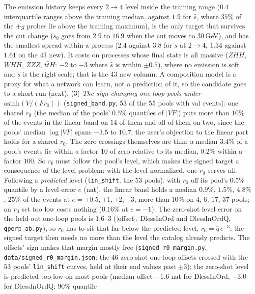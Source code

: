 \documentclass[11pt]{article}
\newcommand{\code}[1]{\texttt{#1}}
\begin{document}
The emission history keeps every $2\to4$ level inside the training range ($0.4$ interquartile ranges above the training
median, against $1.9$ for $\hat s$, where $35\%$ of the $+g$ probes lie above the training maximum), is the only target
that survives the cut change ($s_0$ goes from $2.9$ to $16.9$ when the cut moves to $30$\,GeV), and has the smallest
spread within a process ($2.4$ against $3.8$ for $\hat s$ at $2\to4$, $1.34$ against $1.61$ on the $43$ new). It costs on
processes whose final state is all massive ($Z HH$, $W HH$, $ZZZ$, $t\bar tH$: $-2$ to $-3$ where $\hat s$ is within
$\pm0.5$), where no emission is soft and $\hat s$ is the right scale; that is the $43$ new column. A composition model is a
proxy for what a network can learn, not a prediction of it, so the candidate goes to a short run (next). (3) \emph{The
sign-changing one-loop pools under $\mathrm{asinh}(V/(F r_0))$} (\code{signed\_band.py}, $53$ of the $55$ pools with val
events): one shared $r_0$ (the median of the pools' $0.5\%$ quantiles of $|VF|$) puts more than $10\%$ of the events in the
linear band on $14$ of them and all of them on two, since the pools' median $\log|VF|$ spans $-3.5$ to $10.7$; the user's
objection to the linear part holds for a shared $r_0$. The zero crossings themselves are thin: a median $3.4\%$ of a pool's
events lie within a factor $10$ of zero relative to its median, $0.2\%$ within a factor $100$. So $r_0$ must follow the
pool's level, which makes the signed target a consequence of the level problem: with the level normalized, one $r_0$
serves all. Following a \emph{predicted} level (\code{lin\_shift}, the $53$ pools): with $r_0$ off its pool's $0.5\%$
quantile by a level error $e$ (nat), the linear band holds a median $0.9\%$, $1.5\%$, $4.8\%$, $25\%$ of the events at
$e=+0.5,+1,+2,+3$, more than $10\%$ on $4$, $6$, $17$, $37$ pools; an $r_0$ set too low costs nothing ($0.16\%$ at $e=-1$).
The zero-shot level error on the held-out one-loop pools is $1.6$--$3$ ($|$offset$|$, DlessInOrd and DlessInOrdQ,
\code{qperp\_ab.py}), so $r_0$ has to sit that far below the predicted level, $r_0=\hat q\,e^{-3}$; the
signed target then needs no more than the level the catalog already predicts. The offsets' sign makes that margin
mostly free (\code{signed\_r0\_margin.py}, \code{data/signed\_r0\_margin.json}: the $46$ zero-shot one-loop offsets
crossed with the $53$ pools' \code{lin\_shift} curves, held at their end values past $\pm3$): the zero-shot level is
predicted too low on most pools (median offset $-1.6$ nat for DlessInOrd, $-3.0$ for DlessInOrdQ; $90\%$ quantile
\end{document}
